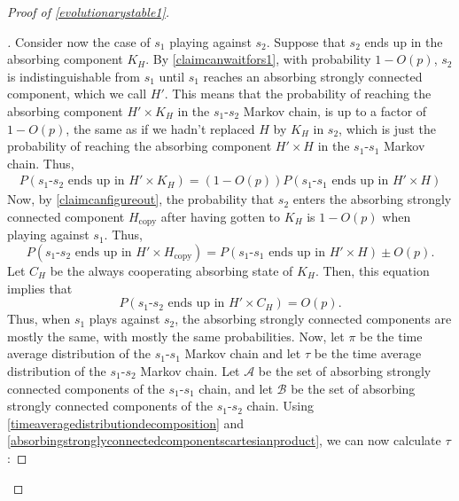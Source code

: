 \documentclass[11pt]{amsart}
\theoremstyle{definition}
\theoremstyle{remark}
\newenvironment{subproof}[1][\proofname]{%
  \renewcommand{\qedsymbol}{$\blacksquare$}%
  \begin{proof}[#1]%
}{%
  \end{proof}%
}
\begin{document}
\begin{proof}[Proof of \cref{evolutionarystable1}]
\begin{subproof}
        Consider now the case of $s_1$ playing against $s_2$. Suppose that $s_2$ ends up in the absorbing component $K_H$. By \cref{claimcanwaitfors1}, with probability $1 - O(p)$, $s_2$ is indistinguishable from $s_1$ until $s_1$ reaches an absorbing strongly connected component, which we call $H'$.         
        This means that the probability of reaching the absorbing component $H' \times K_H$ in the $s_1$-$s_2$ Markov chain, is up to a factor of $1 - O(p)$, the same as if we hadn't replaced $H$ by $K_H$ in $s_2$, which is just the probability of reaching the absorbing component $H' \times H$ in the $s_1$-$s_1$ Markov chain. Thus, 
        \begin{multline*}
          P(\text{$s_1$-$s_2$ ends up in $H' \times K_H$}) = (1 - O(p)) P(\text{$s_1$-$s_1$ ends up in $H' \times H$})
        \end{multline*}
        Now, by \cref{claimcanfigureout}, the probability that $s_2$ enters the absorbing strongly connected component $H_\text{copy}$ after having gotten to $K_H$ is $1 - O(p)$ when playing against $s_1$. Thus,
        \begin{equation}
          \label{equationhhcopy}
          P(\text{$s_1$-$s_2$ ends up in $H' \times H_\text{copy}$}) = P(\text{$s_1$-$s_1$ ends up in $H' \times H$}) \pm O(p).
        \end{equation}
        Let $C_H$ be the always cooperating absorbing state of $K_H$. Then, this equation implies that 
        \begin{equation}
          \label{equationhch}
          P(\text{$s_1$-$s_2$ ends up in $H' \times C_H$}) = O(p).
        \end{equation}
        Thus, when $s_1$ plays against $s_2$, the absorbing strongly connected components are mostly the same, with mostly the same probabilities. 
        Now, let $\pi$ be the time average distribution of the $s_1$-$s_1$ Markov chain and let $\tau$ be the time average distribution of the $s_1$-$s_2$ Markov chain. Let $\mathcal{A}$ be the set of absorbing strongly connected components of the $s_1$-$s_1$ chain, and let $\mathcal{B}$ be the set of absorbing strongly connected components of the $s_1$-$s_2$ chain. Using \cref{timeaveragedistributiondecomposition} and \cref{absorbingstronglyconnectedcomponentscartesianproduct}, we can now calculate $\tau$:


\end{subproof}
\end{proof}
\end{document}
